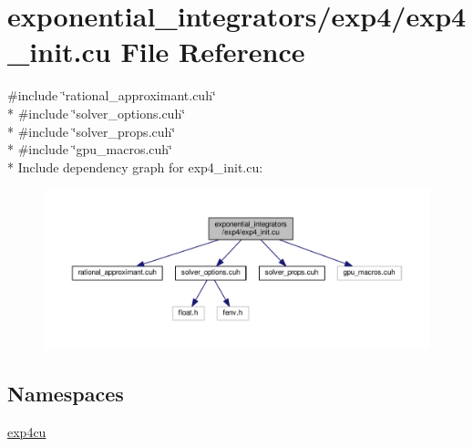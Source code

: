 \hypertarget{exp4__init_8cu}{}\section{exponential\+\_\+integrators/exp4/exp4\+\_\+init.cu File Reference}
\label{exp4__init_8cu}
{\ttfamily \#include \char`\"{}rational\+\_\+approximant.\+cuh\char`\"{}}\\*
{\ttfamily \#include \char`\"{}solver\+\_\+options.\+cuh\char`\"{}}\\*
{\ttfamily \#include \char`\"{}solver\+\_\+props.\+cuh\char`\"{}}\\*
{\ttfamily \#include \char`\"{}gpu\+\_\+macros.\+cuh\char`\"{}}\\*
Include dependency graph for exp4\+\_\+init.\+cu\+:\nopagebreak
\begin{figure}[H]
\begin{center}
\leavevmode
\includegraphics[width=350pt]{exp4__init_8cu__incl}
\end{center}
\end{figure}
\subsection*{Namespaces}
\begin{DoxyCompactItemize}
\item 
 \hyperlink{namespaceexp4cu}{exp4cu}
\end{DoxyCompactItemize}
